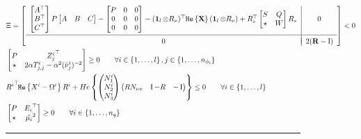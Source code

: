 \documentclass{ifacconf}
\theoremstyle{plain}
\begin{document}
\begin{figure}
\begin{subequations}\label{eqn:LMI}
\begin{align}\label{eqn:lyapunov}
  &\Xi =\left[\begin{matrix}
  \begin{array}{c|c}
  \left[\begin{matrix}\relax{A}^\top\\
  \relax{B}^\top\\
  C^\top
  \end{matrix}\right] P \left[\begin{matrix}\relax{A} & \relax{B} & C\end{matrix}\right] - \left[\begin{matrix}
  P & 0 & 0\\
  0 & 0 & 0\\
  0 & 0 & 0
  \end{matrix}\right] - (\operatorname{\mathbf{1}}_l \otimes R_{\nu})^\top \texttt{\relax{He}}\left\{{{\bf{X}}}\right\} (\operatorname{\mathbf{1}}_l \otimes R_{\nu})
   + R_s^\top \left[\begin{matrix}
    S & Q\\
    \star & W
  \end{matrix}\right]  R_s\hspace{.1em}& 0\\[1.5em]
\hline \\[-0.9em]
  0 & \hspace{.1em} 2 ({\bf{R}} - \operatorname{I})
  \end{array}\end{matrix}\right] < 0\\
  &\left[\begin{matrix}
    P & {Z_j^i}^\top\\
    \star & 2 \alpha T^i_{j,j} - \alpha^2 (\hat{\nu}_j^i)^{-2}
  \end{matrix}\right] \geq 0 \qquad \forall i \in \left\{ 1, \dots, l \right\}, j \in \left\{ 1, \dots, n_{\phi_i} \right\} \label{eqn:inclusion}\\
  &{R^i}^\top\! \texttt{\relax{He}}\left\{{X^i - \Omega^i}\right\} R^i + He\left\{ \left(\begin{matrix}N^i_1\\ N^i_2\\ N^i_3\end{matrix}\right) \left(\begin{matrix}R N_{\nu x} & \operatorname{I} - R & -\operatorname{I}\end{matrix}\right)\right\} \leq 0 \qquad \forall i \in \left\{ 1, \dots, l \right\} \label{eqn:finsler_constraint}\\
  &\left[\begin{matrix}P & {E_i}^\top \\ \star & \hat{\mu_i}^2\end{matrix}\right] \geq 0 \qquad \forall i \in \left\{1, \dots, n_q \right\} \label{eqn:nonlin-inclusion-constraint}
\end{align}
\end{subequations}
\vspace{.5em}
\hrule
\end{figure}
\end{document}
